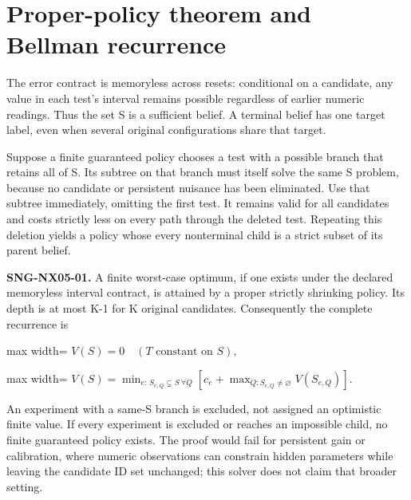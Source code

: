 \documentclass[
  11pt,
  a4paper,
]{report}
\begin{document}
\hypertarget{proper-policy-theorem-and-bellman-recurrence}{%
\section{Proper-policy theorem and Bellman
recurrence}\label{proper-policy-theorem-and-bellman-recurrence}}

The error contract is memoryless across resets: conditional on a
candidate, any value in each test's interval remains possible regardless
of earlier numeric readings. Thus the set S is a sufficient belief. A
terminal belief has one target label, even when several original
configurations share that target.

Suppose a finite guaranteed policy chooses a test with a possible branch
that retains all of S. Its subtree on that branch must itself solve the
same S problem, because no candidate or persistent nuisance has been
eliminated. Use that subtree immediately, omitting the first test. It
remains valid for all candidates and costs strictly less on every path
through the deleted test. Repeating this deletion yields a policy whose
every nonterminal child is a strict subset of its parent belief.

\textbf{SNG-NX05-01.} A finite worst-case optimum, if one exists under
the declared memoryless interval contract, is attained by a proper
strictly shrinking policy. Its depth is at most K-1 for K original
candidates. Consequently the complete recurrence is

\begin{center}
\begin{adjustbox}{max width=\linewidth}
$\displaystyle
V(S)=0\quad(T\text{ constant on }S),
$
\end{adjustbox}
\end{center} \begin{center}
\begin{adjustbox}{max width=\linewidth}
$\displaystyle
V(S)=\min_{e:\,S_{e,Q}\subsetneq S\ \forall Q}
\left[c_e+\max_{Q:S_{e,Q}\ne\varnothing}V(S_{e,Q})\right].
$
\end{adjustbox}
\end{center}

An experiment with a same-S branch is excluded, not assigned an
optimistic finite value. If every experiment is excluded or reaches an
impossible child, no finite guaranteed policy exists. The proof would
fail for persistent gain or calibration, where numeric observations can
constrain hidden parameters while leaving the candidate ID set
unchanged; this solver does not claim that broader setting.
\end{document}
